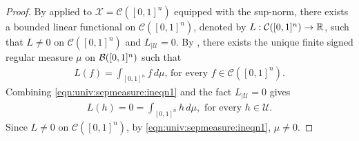 \begin{proof}
By  applied to $\mathcal{X} = \mathcal{C}([0,1]^n)$ equipped with the sup-norm, there exists a bounded linear functional on $\mathcal{C}([0,1]^n)$, denoted by $L : \mathcal{C}([0,1]^n) \to {\mathbb R}$, such that $L \neq 0$ on $\mathcal{C}([0,1]^n)$ and $L_{| \mathcal{U}} = 0$. By , there exists the unique finite signed regular measure $\mu$ on ${\mathcal B}([0,1]^n)$ such that
\begin{align}
    \label{eqn:univ:sepmeasure:ineqn1}
    L (f) = \int_{[0,1]^n} f \, d\mu \text{, for every $f \in\mathcal{C}([0,1]^n)$.}
\end{align}
Combining \ref{eqn:univ:sepmeasure:ineqn1} and the fact $L_{| \mathcal{U}} = 0$ gives
\begin{align*}
    L (h) = 0 =  \int_{[0,1]^n} h \, d\mu, \text{ for every } h \in \mathcal{U}.
\end{align*}
Since $L \neq 0$ on $\mathcal{C}([0,1]^n)$, by \ref{eqn:univ:sepmeasure:ineqn1}, $\mu \neq 0$.
\end{proof}
